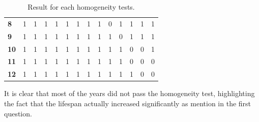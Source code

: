 \documentclass[fleqn]{article}
\begin{document}
\begin{enumerate}[label=\alph*)]
\begin{table}[H]
\begin{tabular}{cccccccccccccc}
        \multicolumn{1}{l|}{\textbf{8}}  & 1          & 1          & 1          & 1          & 1          & 1          & 1          & 1          & 0          & 1          & 1           & 1           & 1           \\
        \multicolumn{1}{l|}{\textbf{9}}  & 1          & 1          & 1          & 1          & 1          & 1          & 1          & 1          & 1          & 0          & 1           & 1           & 1           \\
        \multicolumn{1}{l|}{\textbf{10}} & 1          & 1          & 1          & 1          & 1          & 1          & 1          & 1          & 1          & 1          & 0           & 0           & 1           \\
        \multicolumn{1}{l|}{\textbf{11}} & 1          & 1          & 1          & 1          & 1          & 1          & 1          & 1          & 1          & 1          & 0           & 0           & 0           \\
        \multicolumn{1}{l|}{\textbf{12}} & 1          & 1          & 1          & 1          & 1          & 1          & 1          & 1          & 1          & 1          & 1           & 0           & 0
      \end{tabular}
      \caption{Result for each homogeneity tests.}
      \label{tab:homo}
    \end{table}

    It is clear that most of the years did not pass the homogeneity test,
    highlighting the fact that the lifespan actually increased significantly as
    mention in the first question.


\end{enumerate}
\end{document}
